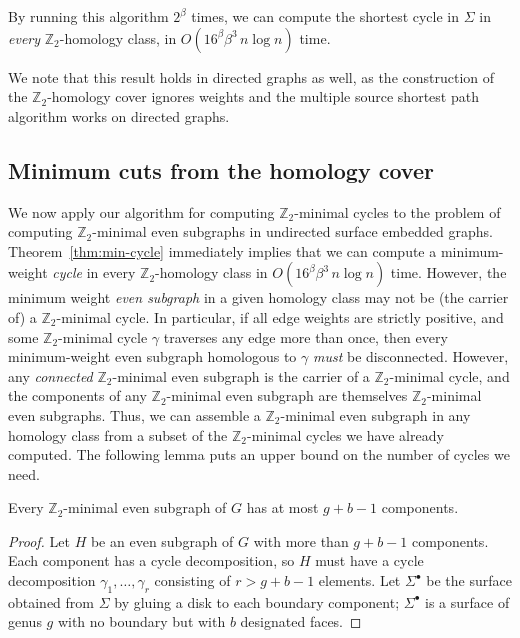 \documentclass[letterpaper,review]{siamart190516}
\def\Z{\mathbb{Z}}
\begin{document}
{By running this algorithm $2^\beta$ times, we can compute the shortest cycle in $\Sigma$ in
\emph{every} $\Z_2$-homology class, in $O(16^\beta \beta^3\, n\log n)$ time.

We note that this result holds in directed graphs as well, as the construction of the $\Z_2$-homology cover ignores weights and the multiple source shortest path algorithm works on directed graphs.


\subsection{Minimum cuts from the homology cover}
\label{sec:homcover_mincut}

We now apply our algorithm for computing $\Z_2$-minimal cycles to the problem of computing $\Z_2$-minimal even subgraphs in undirected surface embedded graphs.
Theorem~\ref{thm:min-cycle} immediately implies that we can compute a minimum-weight \emph{cycle} in
every $\Z_2$-homology class in $O(16^\beta \beta^3\, n\log n)$ time.  However, the minimum weight \emph{even subgraph} in a given homology class may not be (the carrier of) a $\Z_2$-minimal cycle.  In particular, if all edge weights are strictly positive, and some $\Z_2$-minimal cycle $\gamma$ traverses any edge more than once, then every minimum-weight even subgraph homologous to $\gamma$ \emph{must} be disconnected.
However, any \emph{connected} $\Z_2$-minimal even subgraph is the carrier of a $\Z_2$-minimal cycle, and the components of any $\Z_2$-minimal even subgraph are themselves $\Z_2$-minimal even subgraphs.  Thus, we can assemble a $\Z_2$-minimal even subgraph in any homology class from a subset of the $\Z_2$-minimal cycles we have already computed.  The following lemma puts an upper bound on the number of cycles we need.

\begin{lemma}
\label{lem:even-comps}
Every $\Z_2$-minimal even subgraph of $G$ has at most $g+b-1$ components.
\end{lemma}

\begin{proof}
Let $H$ be an even subgraph of $G$ with more than $g+b-1$ components.  Each component has a cycle decomposition, so $H$ must have a cycle decomposition $\gamma_1, \dots, \gamma_r$ consisting of $r > g+b-1$ elements.  Let $\Sigma^\bullet$ be the surface obtained from $\Sigma$ by gluing a disk to each boundary component; $\Sigma^\bullet$ is a surface of genus $g$ with no boundary but with $b$ designated faces.


\end{proof}}
\end{document}
